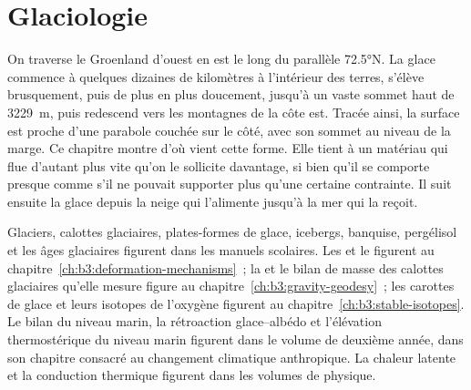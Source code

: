 \chapter{Glaciologie}\label{ch:b3:glaciology}

On traverse le Groenland d'ouest en est le long du parallèle \ang{72.5}N. La glace
commence à quelques dizaines de kilomètres à l'intérieur des terres, s'élève brusquement, puis de plus en plus doucement,
jusqu'à un vaste sommet haut de \qty{3229}{m}, puis redescend vers les montagnes de la
côte est. Tracée ainsi, la surface est proche d'une parabole couchée sur le côté,
avec son sommet au niveau de la marge. Ce chapitre montre d'où vient cette forme.
Elle tient à un matériau qui flue d'autant plus vite qu'on le sollicite davantage,
si bien qu'il se comporte presque comme s'il ne pouvait supporter plus qu'une certaine contrainte.
Il suit ensuite la glace depuis la neige qui l'alimente jusqu'à la mer qui
la reçoit.

\begin{recall}
Glaciers, calottes glaciaires, plates-formes de glace, icebergs, banquise, pergélisol et les
âges glaciaires figurent dans les manuels scolaires. Les  et le  figurent au
chapitre~\ref{ch:b3:deformation-mechanisms}~; la  et le
bilan de masse des calottes glaciaires qu'elle mesure figure au chapitre~\ref{ch:b3:gravity-geodesy}~;
les carottes de glace et leurs isotopes de l'oxygène figurent au chapitre~\ref{ch:b3:stable-isotopes}.
Le bilan du niveau marin, la rétroaction glace--albédo et l'élévation thermostérique
du niveau marin figurent dans le volume de deuxième année, dans son chapitre consacré au
changement climatique anthropique. La chaleur latente et la conduction thermique figurent dans les volumes de physique.
\end{recall}

